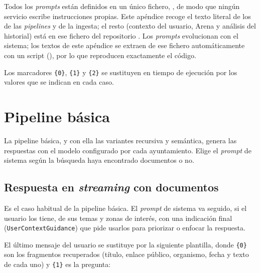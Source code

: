 \label{ap:prompts}

Todos los \emph{prompts} están definidos en un único fichero, , de modo que ningún servicio escribe instrucciones propias. Este apéndice recoge el texto literal de los de las \emph{pipelines} y de la ingesta; el resto (contexto del usuario, Arena y análisis del historial) está en ese fichero del repositorio \cite{repositorio}. Los \emph{prompts} evolucionan con el sistema; los textos de este apéndice se extraen de ese fichero automáticamente con un script (), por lo que reproducen exactamente el código.

Los marcadores \texttt{\{0\}}, \texttt{\{1\}} y \texttt{\{2\}} se sustituyen en tiempo de ejecución por los valores que se indican en cada caso.

\lstset{numbers=none,basicstyle=\ttfamily\footnotesize,breakindent=0pt}

\section{Pipeline básica}

La pipeline básica, y con ella las variantes recursiva y semántica, genera las respuestas con el modelo configurado por cada ayuntamiento. Elige el \emph{prompt} de sistema según la búsqueda haya encontrado documentos o no.

\subsection{Respuesta en \emph{streaming} con documentos}

Es el caso habitual de la pipeline básica. El \emph{prompt} de sistema va seguido, si el usuario los tiene, de sus temas y zonas de interés, con una indicación final (\texttt{UserContextGuidance}) que pide usarlos para priorizar o enfocar la respuesta.



El último mensaje del usuario se sustituye por la siguiente plantilla, donde \texttt{\{0\}} son los fragmentos recuperados (título, enlace público, organismo, fecha y texto de cada uno) y \texttt{\{1\}} es la pregunta:



